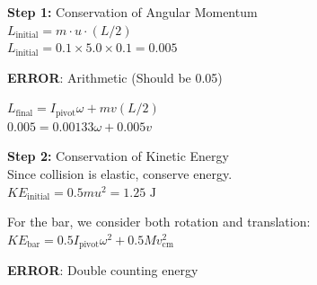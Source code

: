 \begin{minipage}{\linewidth}
\begin{tcolorbox}[
    title={\textbf{JEE Advanced 2023 Paper 1}},
    colback=white,
    colframe=gray!50!black,
    arc=3pt,
    boxrule=1pt,
    fonttitle=\sffamily\large,
    width=\linewidth
]
    \vspace{0.5em}

    \noindent
    \begin{minipage}[t]{0.49\linewidth}
        \vspace{0pt}
        \begin{tcolorbox}[
            title={\small \textbf{BASE MODEL}},
            colframe=blue!60!white,
            colback=blue!5!white,
            coltitle=white,
            fontupper=\small\ttfamily\raggedright,
            boxrule=0.5pt,
            sharp corners,
            left=2pt, right=2pt,
            width=\linewidth,
            nobeforeafter
        ]
            \textbf{\textcolor{blue!60!black}{Step 1:}} Conservation of Angular Momentum\\
            $L_{\text{initial}} = m \cdot u \cdot (L/2)$\\
            $L_{\text{initial}} = 0.1 \times 5.0 \times 0.1 = 0.005$
            
            \vspace{0.3em}
            \colorbox{red!15}{\textcolor{red!80!black}{\textbf{ERROR}: Arithmetic (Should be 0.05)}}
            \vspace{0.3em}
            
            $L_{\text{final}} = I_{\text{pivot}} \omega + m v (L/2)$\\
            $0.005 = 0.00133 \omega + 0.005 v$
            \vspace{1em}
            
            \textbf{\textcolor{blue!60!black}{Step 2:}} Conservation of Kinetic Energy\\
            Since collision is elastic, conserve energy.\\
            $KE_{\text{initial}} = 0.5 m u^2 = 1.25\text{ J}$
            \vspace{0.5em}
            
            For the bar, we consider both rotation and translation:\\
            $KE_{\text{bar}} = 0.5 I_{\text{pivot}} \omega^2 + 0.5 M v_{\text{cm}}^2$
            
            \vspace{0.3em}
            \colorbox{red!15}{\textcolor{red!80!black}{\textbf{ERROR}: Double counting energy}}
            \vspace{0.3em}
            

\end{tcolorbox}
\end{minipage}
\end{tcolorbox}
\end{minipage}
